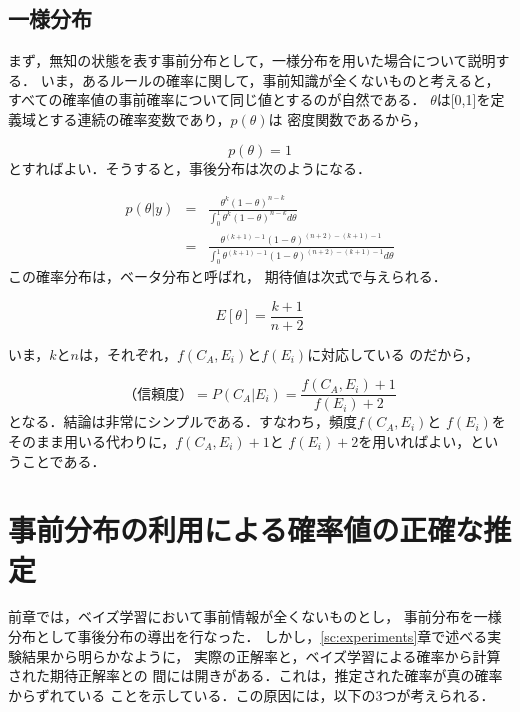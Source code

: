 \subsection{一様分布}
\vspace{-6pt}
まず，無知の状態を表す事前分布として，一様分布を用いた場合について説明する．
いま，あるルールの確率に関して，事前知識が全くないものと考えると，
すべての確率値の事前確率について同じ値とするのが自然である．
$\theta$は[0,1]を定義域とする連続の確率変数であり，$p(\theta)$は
密度関数であるから，

\begin{equation}
	p(\theta) = 1
\end{equation}
とすればよい．そうすると，事後分布は次のようになる．

\begin{eqnarray}
p(\theta | y)
&=& \frac{\theta^k (1-\theta)^{n-k}}{\int_0^1 {\theta^k (1-\theta)^{n-k}} d\theta} \\
	&=& \frac{\theta^{(k+1)-1} (1-\theta)^{(n+2)-(k+1)-1}}{\int_0^1 {\theta^{(k+1)-1} (1-\theta)^{(n+2)-(k+1)-1}} d\theta}
\end{eqnarray}
この確率分布は，ベータ分布と呼ばれ，
期待値は次式で与えられる\cite{鈴木:ベイズ}．

\begin{equation}
	E[\theta] = \frac{k+1}{n+2}
\end{equation}

いま，$k$と$n$は，それぞれ，$f(C_A, E_i)$と$f(E_i)$に対応している
のだから，

\begin{equation}
\label{eq:myreliability}
	（信頼度）=P(C_A|E_i)=\frac{f(C_A, E_i)+1}{f(E_i)+2}
\end{equation}
となる．結論は非常にシンプルである．すなわち，頻度$f(C_A, E_i)$と
$f(E_i)$をそのまま用いる代わりに，$f(C_A, E_i)+1$と
$f(E_i)+2$を用いればよい，ということである．


\section{事前分布の利用による確率値の正確な推定}
前章では，ベイズ学習において事前情報が全くないものとし，
事前分布を一様分布として事後分布の導出を行なった．
しかし，\ref{sc:experiments}章で述べる実験結果から明らかなように，
実際の正解率と，ベイズ学習による確率から計算された期待正解率との
間には開きがある．これは，推定された確率が真の確率からずれている
ことを示している．この原因には，以下の3つが考えられる．

